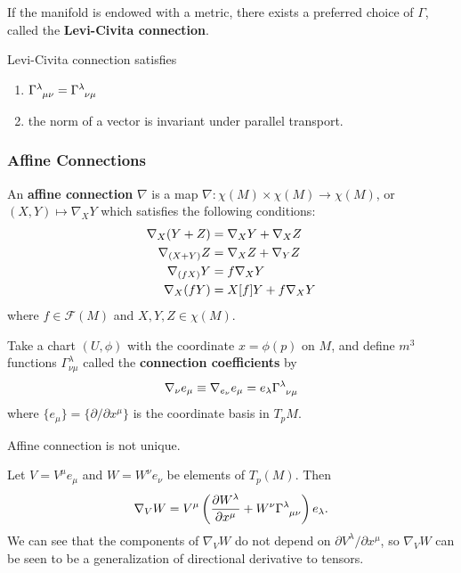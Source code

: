 \documentclass[10pt]{article}
\begin{document}
If the manifold is endowed with a metric, there exists a preferred choice of $\Gamma$, called the \textbf{Levi-Civita connection}.
\begin{property}
    Levi-Civita connection satisfies
    \begin{enumerate}
        \item $\tensor{\Gamma}{^{\lambda}_{\mu\nu}} = \tensor{\Gamma}{^{\lambda}_{\nu\mu}}$
        \item the norm of a vector is invariant under parallel transport.
    \end{enumerate}
\end{property}
\subsubsection{Affine Connections}
\begin{definition}
    An \textbf{affine connection} $\nabla$ is a map $\nabla: \chi(M)\times\chi(M)\to\chi(M)$, or $(X,Y)\mapsto\nabla_X Y$ which satisfies the following conditions:
    \begin{align}
        \nabla_X(Y+Z)   & =\nabla_X Y+\nabla_X Z  \\
        \nabla_{(X+Y)}Z & =\nabla_{X}Z+\nabla_Y Z \\
        \nabla_{(fX)}Y  & =f\nabla_{X}Y\notag     \\
        \nabla_X (fY)   & =X[f]Y+f\nabla_X Y
    \end{align}
    where $f\in\mathcal{F}(M)$ and $X,Y,Z\in\chi(M)$.
\end{definition}

Take a chart $(U,\phi)$ with the coordinate $x=\phi(p)$ on $M$, and define $m^3$ functions $\Gamma_{\nu\mu}^{\lambda}$ called the \textbf{connection coefficients} by
\begin{align}
    \nabla_\nu e_\mu\equiv\nabla_{e_\nu}e_\mu=e_\lambda\tensor{\Gamma}{^{\lambda}_{\nu\mu}}
\end{align}
where $\{e_\mu\}=\{\partial/\partial x^\mu\}$ is the coordinate basis in $T_p M$.
\begin{remark}
    Affine connection is not unique.
\end{remark}
Let $V=V^\mu e_\mu$ and $W=W^\nu e_\nu$ be elements of $T_p(M)$.
Then
\begin{align}
    \nabla_V W=V^\mu\left(\frac{\partial W^\lambda}{\partial x^\mu}+W^\nu \tensor{\Gamma}{^\lambda_{\mu\nu}}\right)e_\lambda.
\end{align}
We can see that the components of $\nabla_VW$ do not depend on $\partial V^\lambda/\partial x^\mu$, so $\nabla_V W$ can be seen to be a generalization of directional derivative to tensors.
\end{document}
